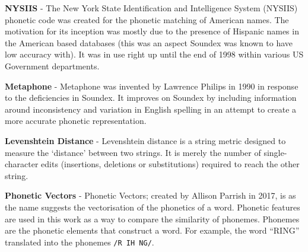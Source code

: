\textbf{NYSIIS} - The New York State Identification and Intelligence System (NYSIIS) phonetic code was created for the phonetic matching of American names. The motivation for its inception was mostly due to the presence of Hispanic names in the American based databases (this was an aspect Soundex was known to have low accuracy with). It was in use right up until the end of 1998 within various US Government departments.

\textbf{Metaphone} - Metaphone was invented by Lawrence Philips in 1990\cite{philips1990hanging} in response to the deficiencies in Soundex. It improves on Soundex by including information around inconsistency and variation in English spelling in an attempt to create a more accurate phonetic representation.

\textbf{Levenshtein Distance} - Levenshtein distance is a string metric designed to measure the `distance' between two strings. It is merely the number of single-character edits (insertions, deletions or substitutions) required to reach the other string.

\textbf{Phonetic Vectors} - Phonetic Vectors; created by Allison Parrish in 2017\cite{parrish2017poetic}, is as the name suggests the vectorisation of the phonetics of a word. Phonetic features are used in this work as a way to compare the similarity of phonemes. Phonemes are the phonetic elements that construct a word. For example, the word ``RING'' translated into the phonemes \verb|/R IH NG/|. 




